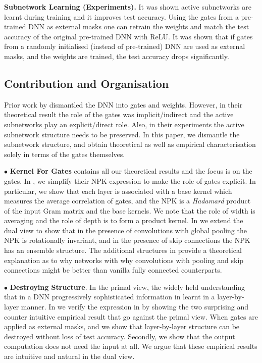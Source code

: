 \documentclass{article} %
\begin{document}
\textbf{Subnetwork Learning (Experiments).}  It was shown active subnetworks are learnt during training and it improves test accuracy.  Using the gates from a pre-trained DNN as external masks one can retrain the weights and match the test accuracy of the original pre-trained DNN with ReLU. 
It was shown that if gates from a randomly initialised (instead of pre-trained) DNN are used as external masks, and the weights are trained, the test accuracy drops significantly. 

\subsection{Contribution and Organisation}
 
Prior work by \cite{npk} dismantled the DNN into gates and weights. However, in their theoretical result the role of the gates was implicit/indirect and the active subnetworks play an explicit/direct role. Also, in their experiments the active subnetwork structure needs to be preserved. In this paper, we dismantle the subnetwork structure, and obtain theoretical as well as empirical characterisation solely in terms of the gates themselves. 


$\bullet$  \textbf{Kernel For Gates}  contains all our theoretical results and the focus is on the gates. In , we simplify their NPK expression to make the role of gates explicit. In particular, we show that each layer is associated with a base kernel which measures the average correlation of gates, and the NPK is a \emph{Hadamard} product of the input Gram matrix and the base kernels. We note that the role of width is averaging and the role of depth is to form a product kernel. In  we extend the dual view to show that in the presence of convolutions with global pooling the NPK is rotationally invariant, and in the presence of skip connections the NPK has an ensemble structure. The additional structures in  provide a theoretical explanation as to why networks with why  convolutions with pooling and skip connections might be better than vanilla fully connected counterparts.

$\bullet$ \textbf{Destroying Structure}. In the primal view, the widely held understanding that in a DNN progressively sophisticated information in learnt in a layer-by-layer manner. In  we verify the expression in  by showing the two surprising and counter intuitive empirical result that go against the primal view. When gates are applied as external masks, and we show that layer-by-layer structure can be destroyed without loss of test accuracy.  Secondly, we show that the output computation does not need the input at all. We argue that these empirical results are intuitive and natural in the dual view.
\end{document}
